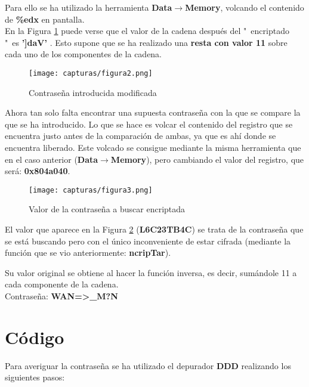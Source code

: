 Para ello se ha utilizado la herramienta \textbf{Data}$ \rightarrow $\textbf{Memory}, volcando el contenido de \textbf{\%edx} en pantalla.\\

En la Figura \ref{fig:figura2} puede verse que el valor de la cadena después del "\ encriptado "\ es \textbf{']daV' }. Esto supone que se ha realizado una \textbf{resta con valor 11} sobre cada uno de los componentes de la cadena.
\begin{figure}[H]
	\centering
	\texttt{[image: capturas/figura2.png]} 
	\caption{Contraseña introducida modificada} 
	\label{fig:figura2}
\end{figure}



Ahora tan solo falta encontrar una supuesta contraseña con la que se compare la que se ha introducido. Lo que se hace es volcar el contenido del registro que se encuentra justo antes de la comparación de ambas, ya que es ahí donde se encuentra liberado. Este volcado se consigue mediante la misma herramienta que en el caso anterior (\textbf{Data}$ \rightarrow $\textbf{Memory}), pero cambiando el valor del registro, que será: \textbf{0x804a040}.
\begin{figure}[H]
	\centering
	\texttt{[image: capturas/figura3.png]} 
	\caption{Valor de la contraseña a buscar encriptada} 
	\label{fig:figura3}
\end{figure}

El valor que aparece en la Figura \ref{fig:figura3} (\textbf{L6C23TB4C}) se trata de la contraseña que se está buscando pero con el único inconveniente de estar cifrada (mediante la función que se vio anteriormente: \textbf{ncripTar}).

Su valor original se obtiene al hacer la función inversa, es decir, sumándole 11 a cada componente de la cadena. \\

Contraseña: \textbf{WAN=>\_M?N}
\newpage

%	

\section{Código}
Para averiguar la contraseña se ha utilizado el depurador \textbf{DDD} realizando los siguientes pasos:
\\

